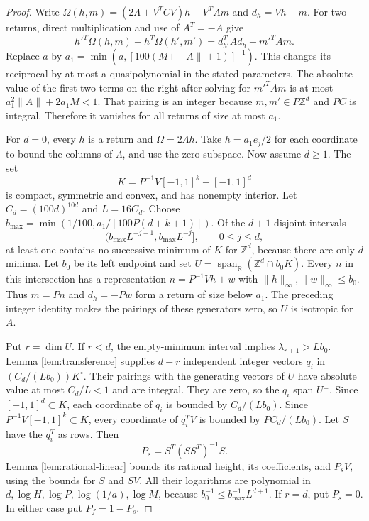 \documentclass[11pt]{article}
\theoremstyle{definition}
\newcommand{\R}{\mathbb R}
\newcommand{\Z}{\mathbb Z}
\numberwithin{equation}{section}
\begin{document}
\begin{proof}
Write $\Omega(h,m)=(2\Lambda+V^TCV)h-V^TAm$ and $d_h=Vh-m$. For two returns, direct multiplication and use of $A^T=-A$ give
\[
 h'^T\Omega(h,m)-h^T\Omega(h',m')=d_{h'}^TAd_h-m'^TAm.
\]
Replace $a$ by $a_1=\min(a,[100(M+\|A\|+1)]^{-1})$. This changes its reciprocal by at most a quasipolynomial in the stated parameters. The absolute value of the first two terms on the right after solving for $m'^TAm$ is at most $a_1^2\|A\|+2a_1M<1$. That pairing is an integer because $m,m'\in P\Z^d$ and $PC$ is integral. Therefore it vanishes for all returns of size at most $a_1$.

For $d=0$, every $h$ is a return and $\Omega=2\Lambda h$. Take $h=a_1e_j/2$ for each coordinate to bound the columns of $\Lambda$, and use the zero subspace. Now assume $d\ge1$. The set
\[
 K=P^{-1}V[-1,1]^k+[-1,1]^d
\]
is compact, symmetric and convex, and has nonempty interior. Let $C_d=(100d)^{10d}$ and $L=16C_d$. Choose $b_{\max}=\min(1/100,a_1/[100P(d+k+1)])$. Of the $d+1$ disjoint intervals
\[
 (b_{\max}L^{-j-1},b_{\max}L^{-j}],\qquad0\le j\le d,
\]
at least one contains no successive minimum of $K$ for $\Z^d$, because there are only $d$ minima. Let $b_0$ be its left endpoint and set $U=\operatorname{span}_{\R}(\Z^d\cap b_0K)$. Every $n$ in this intersection has a representation $n=P^{-1}Vh+w$ with $\|h\|_\infty,\|w\|_\infty\le b_0$. Thus $m=Pn$ and $d_h=-Pw$ form a return of size below $a_1$. The preceding integer identity makes the pairings of these generators zero, so $U$ is isotropic for $A$.

Put $r=\dim U$. If $r<d$, the empty-minimum interval implies $\lambda_{r+1}>Lb_0$. Lemma \ref{lem:transference} supplies $d-r$ independent integer vectors $q_i$ in $(C_d/(Lb_0))K^\circ$. Their pairings with the generating vectors of $U$ have absolute value at most $C_d/L<1$ and are integral. They are zero, so the $q_i$ span $U^\perp$. Since $[-1,1]^d\subset K$, each coordinate of $q_i$ is bounded by $C_d/(Lb_0)$. Since $P^{-1}V[-1,1]^k\subset K$, every coordinate of $q_i^TV$ is bounded by $PC_d/(Lb_0)$. Let $S$ have the $q_i^T$ as rows. Then
\[
 P_s=S^T(SS^T)^{-1}S.
\]
Lemma \ref{lem:rational-linear} bounds its rational height, its coefficients, and $P_sV$, using the bounds for $S$ and $SV$. All their logarithms are polynomial in $d,\log H,\log P,\log(1/a),\log M$, because $b_0^{-1}\le b_{\max}^{-1}L^{d+1}$. If $r=d$, put $P_s=0$. In either case put $P_f=1-P_s$.


\end{proof}
\end{document}
